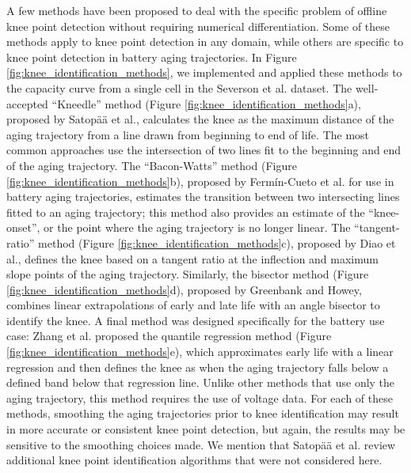 \documentclass[journal=jpclcd,manuscript=article]{achemso}
\begin{document}
A few methods have been proposed to deal with the specific problem of offline knee point detection without requiring numerical differentiation. Some of these methods apply to knee point detection in any domain, while others are specific to knee point detection in battery aging trajectories. 
In Figure \ref{fig:knee_identification_methods}, we implemented and applied these methods to the capacity curve from a single cell in the Severson et al.\cite{severson_data-driven_2019} dataset.
The well-accepted ``Kneedle'' method (Figure \ref{fig:knee_identification_methods}a), proposed by Satop{\"a}{\"a} et al.\cite{satopaa_finding_2011}{}, calculates the knee as the maximum distance of the aging trajectory from a line drawn from beginning to end of life.
The most common approaches use the intersection of two lines fit to the beginning and end of the aging trajectory.
The ``Bacon-Watts'' method (Figure \ref{fig:knee_identification_methods}b), proposed by Fermín-Cueto et al. \cite{fermin-cueto_identification_2020} for use in battery aging trajectories, estimates the transition between two intersecting lines fitted to an aging trajectory; this method also provides an estimate of the ``knee-onset'', or the point where the aging trajectory is no longer linear.
The ``tangent-ratio'' method (Figure \ref{fig:knee_identification_methods}c), proposed by Diao et al.\cite{diao_algorithm_2019}{}, defines the knee based on a tangent ratio at the inflection and maximum slope points of the aging trajectory.
Similarly, the bisector method (Figure \ref{fig:knee_identification_methods}d), proposed by Greenbank and Howey\cite{greenbank_automated_2021}{}, combines linear extrapolations of early and late life with an angle bisector to identify the knee.
A final method was designed specifically for the battery use case: Zhang et al.\cite{zhang_accelerated_2019} proposed the quantile regression method (Figure \ref{fig:knee_identification_methods}e), which approximates early life with a linear regression and then defines the knee as when the aging trajectory falls below a defined band below that regression line.
Unlike other methods that use only the aging trajectory, this method requires the use of voltage data.
For each of these methods, smoothing the aging trajectories prior to knee identification may result in more accurate or consistent knee point detection\cite{strange_elbows_2021}{}, but again,
the results may be sensitive to the smoothing choices made.
We mention that Satop{\"a}{\"a} et al.\cite{satopaa_finding_2011} review additional knee point identification algorithms that were not considered here.
\end{document}
